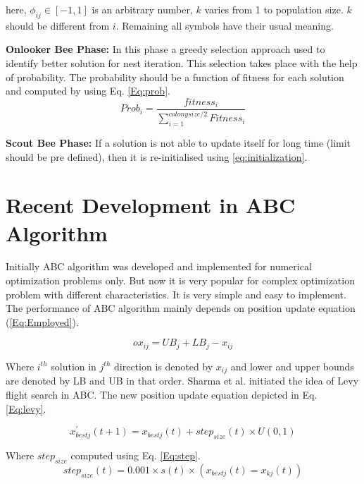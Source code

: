 \documentclass{svproc}
\begin{document}
here, $\phi_{ij} \in [-1,1]$ is an arbitrary number, $k$ varies from 1 to population size. $k$ should be different from $i$. Remaining all symbols have their usual meaning.

\textbf{Onlooker Bee Phase:} In this phase a greedy selection approach used to identify better solution for nest iteration. This selection takes place with the help of probability. The probability should be a function of fitness for each solution and computed by using Eq. \ref{Eq:prob}.
\begin{equation}\label{Eq:prob}
  Prob_{i}=\frac{fitness_{i}}{\sum_{i=1}^{colonysize/2}Fitness_{i}}
\end{equation}

\textbf{Scout Bee Phase:} If a solution is not able to update itself for long time (limit should be pre defined), then it is re-initialised using \ref{eq:initialization}.

\section{Recent Development in ABC Algorithm}\label{sec:modifications}
Initially ABC algorithm was developed and implemented for numerical optimization problems only. But now it is very popular for complex optimization problem with different characteristics. It is very simple and easy to implement. The performance of ABC algorithm mainly depends on position update equation (\ref{Eq:Employed}).

\begin{equation}\label{Eq:obl}
  ox_{ij}=UB_j+LB_j - x_{ij}
\end{equation}

Where $i^{th}$ solution in $j^{th}$ direction is denoted by $x_{ij}$ and lower and upper bounds are denoted by LB and UB in that order.
Sharma et al. \cite{sharma2016levy} initiated the idea of Levy flight search in ABC. The new position update equation depicted in Eq. \ref{Eq:levy}.

\begin{equation}\label{Eq:levy}
  x^{'}_{bestj}(t+1)=x_{bestj}(t)+step_{size}(t) \times U(0,1)
\end{equation}

Where $step_{size}$ computed using Eq. \ref{Eq:step}.
\begin{equation}\label{Eq:step}
  step_{size}(t)= 0.001 \times s(t) \times (x_{bestj}(t)=x_{kj}(t))
\end{equation}
\end{document}

